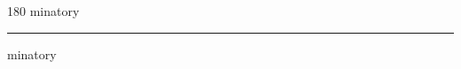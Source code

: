 
\begin{frame}
\begin{center}
\begin{turn}{180}
{\fontsize{2.5cm}{1em}\selectfont minatory}
\end{turn}
\vspace{1em}\par  
\hrule
\vspace{1em}\par  
{\fontsize{2.5cm}{1em}\selectfont minatory}
\end{center}
\end{frame}
